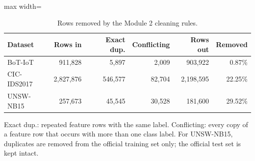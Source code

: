 \begin{table}[t]
\centering
\caption{Rows removed by the Module 2 cleaning rules.}
\label{tab:cleaning}
\footnotesize
\setlength{\tabcolsep}{3.5pt}
\begin{adjustbox}{max width=\linewidth}
\begin{tabular}{lrrrrr}
\toprule
Dataset & Rows in & Exact dup. & Conflicting & Rows out & Removed \\
\midrule
BoT-IoT & 911,828 & 5,897 & 2,009 & 903,922 & 0.87\% \\
CIC-IDS2017 & 2,827,876 & 546,577 & 82,704 & 2,198,595 & 22.25\% \\
UNSW-NB15 & 257,673 & 45,545 & 30,528 & 181,600 & 29.52\% \\
\bottomrule
\end{tabular}
\end{adjustbox}
\par\vspace{2pt}
\parbox{0.98\linewidth}{\scriptsize Exact dup.: repeated feature rows with the same label. Conflicting: every copy of a feature row that occurs with more than one class label. For UNSW-NB15, duplicates are removed from the official training set only; the official test set is kept intact.}
\end{table}
